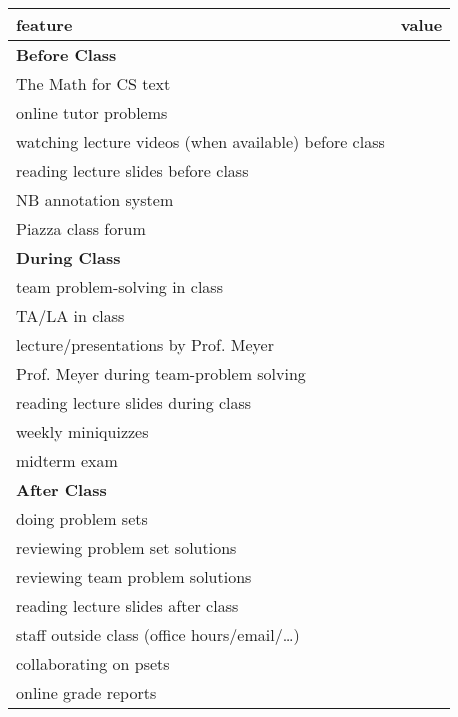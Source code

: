 \documentclass[handout]{mcs}
\begin{document}
\begin{center}

\begin{tabular}{| l | c |}
\hline
\hspace{1in} feature &  value\\  %
\hline  \hline
\textbf{Before Class} \\ \hline \hline
   The Math for CS text          & \\  \hline
   online tutor problems & \\  \hline
   watching lecture videos (when available) before class    & \\  \hline
   reading lecture slides before class    & \\  \hline
   NB annotation system  & \\  \hline
   Piazza class forum  & \\  \hline
\hline
\textbf{During Class}\\ \hline \hline
   team problem-solving in class  & \\   \hline
   TA/LA in class        & \\  \hline
   lecture/presentations by Prof. Meyer  & \\  \hline
   Prof. Meyer during team-problem solving &\\ \hline
   reading lecture slides during class    & \\  \hline
   weekly miniquizzes                   & \\  \hline
   midterm exam                   & \\  \hline
\hline
\textbf{After Class}\\ \hline \hline
   doing problem sets          & \\  \hline
   reviewing problem set solutions & \\  \hline
   reviewing team problem solutions       & \\  \hline
   reading lecture slides after class     & \\  \hline
   staff outside class (office hours/email/\dots) & \\  \hline
   collaborating on psets                 & \\  \hline
   online grade reports                   & \\  \hline
\end{tabular}
\end{center}
\end{document}
